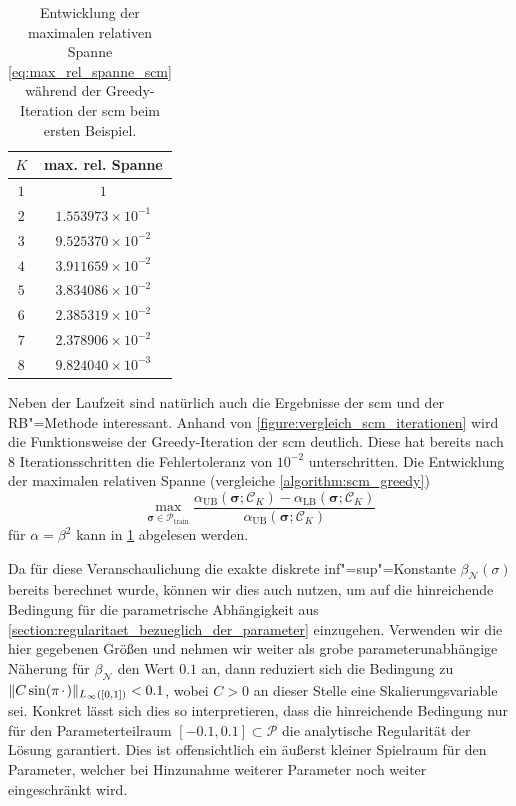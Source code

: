 \documentclass[../main.tex]{subfiles}
\begin{document}
\begin{table}[tb]
    \centering
    \begin{tabular}{|c|c|}\hline
     $K$ &      max. rel. Spanne \\ \hline
     $1$ &          $1$              \\ %
     $2$ & $1.553973{\times}10^{-1}$ \\ %
     $3$ & $9.525370{\times}10^{-2}$ \\ %
     $4$ & $3.911659{\times}10^{-2}$ \\ %
     $5$ & $3.834086{\times}10^{-2}$ \\ %
     $6$ & $2.385319{\times}10^{-2}$ \\ %
     $7$ & $2.378906{\times}10^{-2}$ \\ %
     $8$ & $9.824040{\times}10^{-3}$ \\ \hline
    \end{tabular}
    \caption[Entwicklung der maximalen relativen Spanne bei der \ac{scm}, erstes Beispiel.]{%
        Entwicklung der maximalen relativen Spanne \cref{eq:max_rel_spanne_scm} während der Greedy-Iteration der \ac{scm} beim ersten Beispiel.
    }
    \label{table:entwicklung_scm_abweichung}
\end{table}

Neben der Laufzeit sind natürlich auch die Ergebnisse der \ac{scm} und der RB"=Methode interessant.
Anhand von \cref{figure:vergleich_scm_iterationen} wird die Funktionsweise der Greedy-Iteration der \ac{scm} deutlich.
Diese hat bereits nach $8$ Iterationsschritten die Fehlertoleranz von $10^{-2}$ unterschritten.
Die Entwicklung der maximalen relativen Spanne (vergleiche \cref{algorithm:scm_greedy})
\begin{equation}\label{eq:max_rel_spanne_scm}
    \max_{\bm \sigma \in \mathcal P_{\mathrm{train}}}
    \frac{\alpha_{\mathrm{UB}}(\bm \sigma; \mathcal C_{K}) - \alpha_{\mathrm{LB}}(\bm \sigma; \mathcal C_{K})}{\alpha_{\mathrm{UB}}(\bm \sigma; \mathcal C_{K})}
\end{equation}
für $\alpha = \beta^{2}$ kann in \cref{table:entwicklung_scm_abweichung} abgelesen werden.

Da für diese Veranschaulichung die exakte diskrete inf"=sup"=Konstante $\beta_{\mathcal N}(\sigma)$ bereits berechnet wurde, können wir dies auch nutzen, um auf die hinreichende Bedingung für die parametrische Abhängigkeit aus \cref{section:regularitaet_bezueglich_der_parameter} einzugehen.
Verwenden wir die hier gegebenen Größen und nehmen wir weiter als grobe parameterunabhängige Näherung für $\beta_{\mathcal N}$ den Wert $0.1$ an, dann reduziert sich die Bedingung zu $\lVert C \sin(\pi {\mkern2mu\cdot\mkern2mu})\rVert_{L_{\infty}([0, 1])} < 0.1$, wobei $C > 0$ an dieser Stelle eine Skalierungsvariable sei.
Konkret lässt sich dies so interpretieren, dass die hinreichende Bedingung nur für den Parameterteilraum $[-0.1, 0.1] \subset \mathcal P$ die analytische Regularität der Lösung garantiert.
Dies ist offensichtlich ein äußerst kleiner Spielraum für den Parameter, welcher bei Hinzunahme weiterer Parameter noch weiter eingeschränkt wird.
\end{document}
